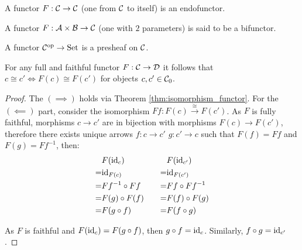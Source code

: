 \begin{definition}
  A functor $F:\mathcal{C}\to \mathcal{C}$ (one from $\mathcal{C}$ to itself) is an endofunctor.
  \parencite{adamek_herrlich_strecker:joy_cats}
\end{definition}

\begin{definition}
  A functor $F:\mathcal{A}\times \mathcal{B} \to \mathcal{C}$ (one with $2$ parameters) is said to be a
  bifunctor.
  \parencite{lane:working_mathematician}
\end{definition}

\begin{definition}
  A functor $\mathcal{C}^{\mathrm{op}} \to \mathrm{Set}$ is a presheaf on $\mathcal{C}$.
  \parencite{leinster:basic_category_theory}
\end{definition}

\begin{theorem}\label{thm:full_faithful_isomorphism}

  For any full and faithful functor $F:\mathcal{C}\to \mathcal{D}$ it follows that $c \cong c'
  \iff F(c) \cong F(c')$ for objects $c, c'\in \mathcal{C}_0$.

  \begin{proof}
    The $(\implies)$ holds via Theorem \ref{thm:isomorphism_functor}. For the
    $(\impliedby)$ part, consider the isomorphism $Ff: F(c) \overset{\cong}{\to}
    F(c')$. As $F$ is fully faithful, morphisms $c\to c'$ are in bijection
    with morphisms $F(c)\to F(c')$, therefore there exists unique arrows $f:c\to c'$ $g:c'\to c$ such that $F(f) = Ff$ and $F(g) = Ff^{-1}$, then:
    \[
      \begin{aligned}
        &F(\mathrm{id}_c)\\
        =& \mathrm{id}_{F(c)}\\
        =& Ff^{-1} \circ Ff\\
        =& F(g) \circ F(f)\\
        =& F(g\circ f)
      \end{aligned}
      \qquad
      \begin{aligned}
        &F(\mathrm{id}_{c'})\\
        =& \mathrm{id}_{F(c')}\\
        =& Ff \circ Ff^{-1}\\
        =& F(f) \circ F(g)\\
        =& F(f\circ g)
      \end{aligned}
    \]

    As $F$ is faithful and $F(\mathrm{id}_c) = F(g\circ f)$, then $g\circ f = \mathrm{id}_c$.
    Similarly, $f\circ g = \mathrm{id}_{c'}$.
  \end{proof}
\end{theorem}